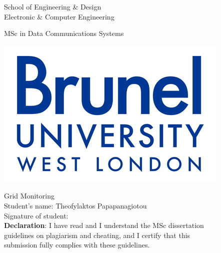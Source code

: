 \thispagestyle{empty}

\begin{center}
\Large
School of Engineering \& Design\\
Electronic \& Computer Engineering\\
\vspace{1\baselineskip}

MSc in Data Communications Systems\\
\vspace{1\baselineskip}

\begin{center}
\includegraphics{images/brunellogo.jpg}\\
\end{center}
\vspace{1\baselineskip}

\Huge
Grid Monitoring\\
\vspace{2\baselineskip}
\Large
Student's name: Theofylaktos Papapanagiotou \\
Signature of student: \\

\vspace{1.8\baselineskip}
\large
{\bf Declaration}: I have read and I understand the MSc dissertation\\
guidelines on plagiarism and cheating, and I certify that this\\
submission fully complies with these guidelines.
\end{center}
